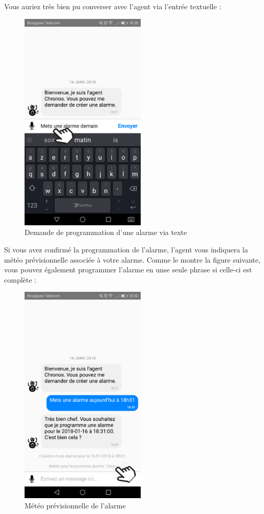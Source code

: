 Vous auriez très bien pu converser avec l'agent via l'entrée textuelle :

\begin{figure}[H]
  \centering
  \includegraphics[width=6cm]{images/F.png}
  \caption{Demande de programmation d'une alarme via texte}
\end{figure}

Si vous avez confirmé la programmation de l'alarme, l'agent vous indiquera la météo prévisionnelle associée à votre alarme. Comme le montre la
figure suivante, vous pouvez également programmer l'alarme en unse seule phrase si celle-ci est complète :

\begin{figure}[H]
  \centering
  \includegraphics[width=6cm]{images/G.png}
  \caption{Météo prévisionnelle de l'alarme}
\end{figure}

